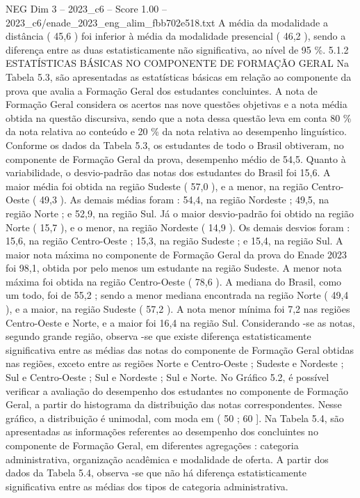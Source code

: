 \begin{textsample}{NEG Dim 3 – 2023\_c6 – Score 1.00 – 2023\_c6/enade\_2023\_eng\_alim\_fbb702e518.txt}
A média da modalidade a distância ( 45,6 ) foi inferior à média da modalidade presencial ( 46,2 ), sendo a diferença entre as duas estatisticamente não significativa, ao nível de 95 \%. 5.1.2 ESTATÍSTICAS BÁSICAS NO COMPONENTE DE FORMAÇÃO GERAL Na Tabela 5.3, são apresentadas as estatísticas básicas em relação ao componente da prova que avalia a Formação Geral dos estudantes concluintes.
A nota de Formação Geral considera os acertos nas nove questões objetivas e a nota média obtida na questão discursiva, sendo que a nota dessa questão leva em conta 80 \% da nota relativa ao conteúdo e 20 \% da nota relativa ao desempenho linguístico.
Conforme os dados da Tabela 5.3, os estudantes de todo o Brasil obtiveram, no componente de Formação Geral da prova, desempenho médio de 54,5.
Quanto à variabilidade, o desvio-padrão das notas dos estudantes do Brasil foi 15,6.
A maior média foi obtida na região Sudeste ( 57,0 ), e a menor, na região Centro-Oeste ( 49,3 ).
As demais médias foram : 54,4, na região Nordeste ; 49,5, na região Norte ; e 52,9, na região Sul.
Já o maior desvio-padrão foi obtido na região Norte ( 15,7 ), e o menor, na região Nordeste ( 14,9 ).
Os demais desvios foram : 15,6, na região Centro-Oeste ; 15,3, na região Sudeste ; e 15,4, na região Sul.
A maior nota máxima no componente de Formação Geral da prova do Enade 2023 foi 98,1, obtida por pelo menos um estudante na região Sudeste.
A menor nota máxima foi obtida na região Centro-Oeste ( 78,6 ).
A mediana do Brasil, como um todo, foi de 55,2 ; sendo a menor mediana encontrada na região Norte ( 49,4 ), e a maior, na região Sudeste ( 57,2 ).
A nota menor mínima foi 7,2 nas regiões Centro-Oeste e Norte, e a maior foi 16,4 na região Sul.
Considerando -se as notas, segundo grande região, observa -se que existe diferença estatisticamente significativa entre as médias das notas do componente de Formação Geral obtidas nas regiões, exceto entre as regiões Norte e Centro-Oeste ; Sudeste e Nordeste ; Sul e Centro-Oeste ; Sul e Nordeste ; Sul e Norte.
No Gráfico 5.2, é possível verificar a avaliação do desempenho dos estudantes no componente de Formação Geral, a partir do histograma da distribuição das notas correspondentes.
Nesse gráfico, a distribuição é unimodal, com moda em ( 50 ; 60 ].
Na Tabela 5.4, são apresentadas as informações referentes ao desempenho dos concluintes no componente de Formação Geral, em diferentes agregações : categoria administrativa, organização acadêmica e modalidade de oferta.
A partir dos dados da Tabela 5.4, observa -se que não há diferença estatisticamente significativa entre as médias dos tipos de categoria administrativa.

\end{textsample}
